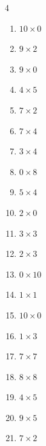 \begin{multicols}{4}
\begin{enumerate}
  \item $10\times 0$
        \phantom{$=0$}

  \item $9\times 2$
        \phantom{$=18$}

  \item $9\times 0$
        \phantom{$=0$}

  \item $4\times 5$
        \phantom{$=20$}

  \item $7\times 2$
        \phantom{$=14$}

  \item $7\times 4$
        \phantom{$=28$}

  \item $3\times 4$
        \phantom{$=12$}

  \item $0\times 8$
        \phantom{$=0$}

  \item $5\times 4$
        \phantom{$=20$}

  \item $2\times 0$
        \phantom{$=0$}

  \item $3\times 3$
        \phantom{$=9$}

  \item $2\times 3$
        \phantom{$=6$}

  \item $0\times 10$
        \phantom{$=0$}

  \item $1\times 1$
        \phantom{$=1$}

  \item $10\times 0$
        \phantom{$=0$}

  \item $1\times 3$
        \phantom{$=3$}

  \item $7\times 7$
        \phantom{$=49$}

  \item $8\times 8$
        \phantom{$=64$}

  \item $4\times 5$
        \phantom{$=20$}

  \item $9\times 5$
        \phantom{$=45$}

  \item $7\times 2$
        \phantom{$=14$}


\end{enumerate}
\end{multicols}
